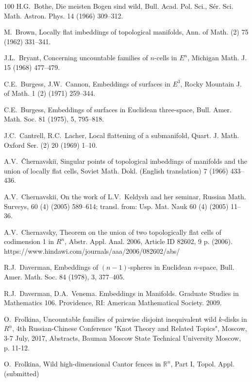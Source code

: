 \documentclass[12pt]{article}
\theoremstyle{definition}
\begin{document}
\begin{thebibliography}{100}
H.G.~Bothe,
Die meisten Bogen sind wild,
Bull. Acad. Pol. Sci., S\'er. Sci. Math. Astron. Phys. 14  (1966) 309--312.

M.~Brown,
Locally flat imbeddings of
topological manifolds,
Ann. of Math. (2) 75 (1962) 331--341.

J.L.~Bryant,
Concerning uncountable families of $n$-cells in $E^n$,
Michigan Math. J. 15 (1968) 477--479.


C.E.~Burgess, J.W.~Cannon,
Embeddings of surfaces in $E^3$,
Rocky Mountain J. of Math.
1 (2) (1971) 259--344.

C.E.~Burgess,
Embeddings of surfaces in Euclidean three-space, 
Bull. Amer. Math. Soc.
81 (1975), 5, 795--818.

J.C.~Cantrell, R.C.~Lacher,
Local flattening of a submanifold,
Quart. J. Math. Oxford Ser. (2) 20 (1969) 1--10.

A.V.~\v{C}hernavski\u{i},
 Singular points of topological imbeddings of manifolds and the
union of locally flat cells, Soviet Math. Dokl. 
(English translation) 7 (1966) 433--436. 


A.V.~Chernavskii,
On the work of L.V.~Keldysh and her seminar,
Russian Math. Surveys, 60 (4) (2005) 589--614;
transl. from: Usp. Mat. Nauk 60 (4) (2005)  11--36.

A.V.~Chernavsky,
Theorem on the union of two topologically flat
cells of codimension 1 in $R^n$,
Abstr. Appl. Anal. 2006, Article ID 82602, 9 p. (2006).
https://www.hindawi.com/journals/aaa/2006/082602/abs/

R.J.~Daverman, 
Embeddings of $(n-1)$-spheres in
Euclidean $n$-space,
Bull. Amer. Math. Soc.
84 (1978), 3, 377--405.

R.J.~Daverman, D.A.~Venema.
Embeddings in Manifolds.
Graduate Studies in Mathematics 106. Providence, RI: American Mathematical Society.
2009.


O.~Frolkina,
 Uncountable families of pairwise disjoint inequivalent wild $k$-disks in $R^n$,
4th Russian-Chinese Conference "Knot Theory and Related Topics", Moscow, 3-7 July, 2017, Abstracts, Bauman Moscow State Technical University Moscow, p. 11-12.

O.~Frolkina,
Wild high-dimensional Cantor fences in $\mathbb R^n$, Part I, Topol. Appl. (submitted)



\end{thebibliography}
\end{document}
